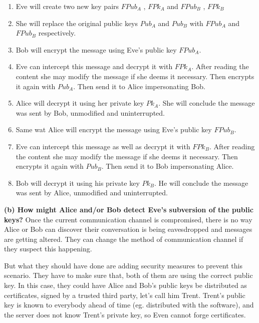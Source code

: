 \documentclass{article}
\begin{document}
\begin{enumerate}

\item Eve will create two new key pairs $FPub_A$ , $FPk_A$ and $FPub_B$ , $FPk_B$
\item She will replace the original public keys $Pub_A$ and $Pub_B$ with $FPub_A$ and $FPub_B$ respectively.
\item Bob will encrypt the message using Eve's public key $FPub_A$.
\item Eve can intercept this message and decrypt it with $FPk_A$. After reading the content she may modify the message if she deems it necessary. Then encrypts it again with $Pub_A$. Then send it to Alice impersonating Bob.
\item Alice will decrypt it using her private key $Pk_A$. She will conclude the message was sent by Bob, unmodified and uninterrupted.


\item Same wat Alice will encrypt the message using Eve's public key $FPub_B$.
\item Eve can intercept this message as well as decrypt it with $FPk_B$. After reading the content she may modify the message if she deems it necessary. Then encrypts it again with $Pub_B$. Then send it to Bob impersonating Alice.
\item Bob will decrypt it using his private key $Pk_B$. He will conclude the message was sent by Alice, unmodified and uninterrupted.

\end{enumerate}



\textbf{(b) How might Alice and/or Bob detect Eve’s subversion of the public keys?}
\newline \newline Once the current communication channel is compromised, there is no way Alice or Bob can discover their conversation is being eavesdropped and messages are getting altered. They can change the method of communication channel if they suspect this happening.

But what they should have done are adding security measures to prevent this scenario. They have to make sure that, both of them  are using the correct public key. In this case, they could have Alice and Bob's public keys be distributed as certificates, signed by a trusted third party, let's call him Trent. Trent's public key is known to everybody ahead of time (eg. distributed with the software), and the server does not know Trent's private key, so Even cannot forge certificates.
\end{document}
